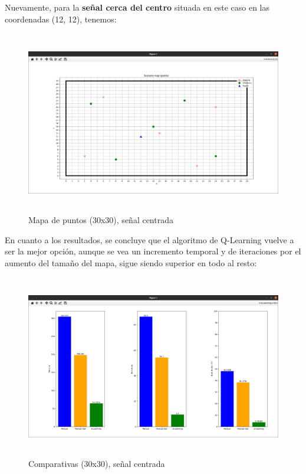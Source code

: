 Nuevamente, para la \textbf{señal cerca del centro} situada en este caso en las coordenadas (12, 12), tenemos:

\begin{figure} [H]
    \begin{center}
    \includegraphics[height=8cm]{imagenes/cap4/21_mapa_p_centro_30.png}
    \end{center}
    \caption[Mapa de puntos (30x30), señal centrada]{Mapa de puntos (30x30), señal centrada}
    \label{fig:map_p_center_30}
\end{figure}

En cuanto a los resultados, se concluye que el algoritmo de Q-Learning vuelve a ser la mejor opción, aunque se vea un incremento temporal y de iteraciones por el aumento del tamaño del mapa, sigue siendo superior en todo al resto:\\

\begin{figure} [H]
    \begin{center}
    \includegraphics[height=8cm]{imagenes/cap4/22_comp_centro_30.png}
    \end{center}
    \caption[Comparativas (30x30), señal centrada]{Comparativas (30x30), señal centrada}
    \label{fig:comp_center_30}
\end{figure}

